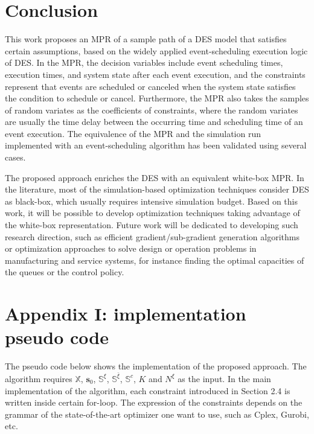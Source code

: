 \documentclass[suppldata]{interact}
\theoremstyle{plain}
\theoremstyle{definition}
\theoremstyle{remark}
\begin{document}
\section{Conclusion}\label{sec:conclusion}

This work proposes an MPR of a sample path of a DES model that satisfies certain assumptions, based on the widely applied event-scheduling execution logic of DES. In the MPR, the decision variables include event scheduling times, execution times, and system state after each event execution, and the constraints represent that events are scheduled or canceled when the system state satisfies the condition to schedule or cancel. Furthermore, the MPR also takes the samples of random variates as the coefficients of constraints, where the random variates are usually the time delay between the occurring time and scheduling time of an event execution. The equivalence of the MPR and the simulation run implemented with an event-scheduling algorithm has been validated using several cases. 

The proposed approach enriches the DES with an equivalent white-box MPR. In the literature, most of the simulation-based optimization techniques consider DES as black-box, which usually requires intensive simulation budget. Based on this work, it will be possible to develop optimization techniques taking advantage of the white-box representation. Future work will be dedicated to developing such research direction, such as efficient gradient/sub-gradient generation algorithms or optimization approaches to solve design or operation problems in manufacturing and service systems, for instance finding the optimal capacities of the queues or the control policy. 




\section*{Appendix I: implementation pseudo code}
The pseudo code below shows the implementation of the proposed approach. The algorithm requires $\mathbb{X}$, $\textbf{s}_0$, $\mathbb{S}^{\xi}$, $\mathbb{S}^{\bar{\xi}}$, $\mathbb{S}^{c}$, $K$ and $N^{\xi}$ as the input. In the main implementation of the algorithm, each constraint introduced in Section 2.4 is written inside certain for-loop. The expression of the constraints depends on the grammar of the state-of-the-art optimizer one want to use, such as Cplex, Gurobi, etc.
\end{document}
